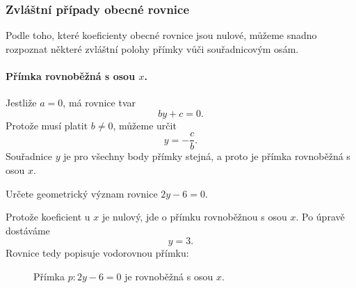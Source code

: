 \subsubsection{Zvláštní případy obecné rovnice}
\label{subsubsec:Special_general_line_equations}

Podle toho, které koeficienty obecné rovnice jsou nulové, můžeme snadno
rozpoznat některé zvláštní polohy přímky vůči souřadnicovým osám.

\paragraph{Přímka rovnoběžná s osou $x$.}

Jestliže $a=0$, má rovnice tvar
\[
    by+c=0.
\]
Protože musí platit $b\neq0$, můžeme určit
\[
    y=-\frac{c}{b}.
\]
Souřadnice $y$ je pro všechny body přímky stejná, a proto je přímka
rovnoběžná s osou $x$.

\begin{example}
    Určete geometrický význam rovnice $2y-6=0$.

    Protože koeficient u $x$ je nulový, jde o přímku rovnoběžnou s osou $x$.
    Po úpravě dostáváme
    \[
        y=3.
    \]
    Rovnice tedy popisuje vodorovnou přímku:
    \begin{figure}[H]
         \centering
        \caption{Přímka $p:2y-6=0$ je rovnoběžná s osou $x$.}
        \label{fig:Line_parallel_x_axis}
    \end{figure}
\end{example}

